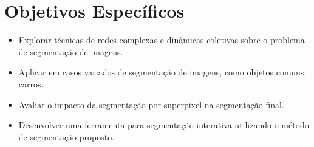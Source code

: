 \section{Objetivos Específicos}\label{sec:objetivo-geral}

\begin{itemize}
\item Explorar técnicas de redes complexas e dinâmicas coletivas sobre
  o problema de segmentação de imagens.
\item Aplicar em casos variados de segmentação de imagens, como
  objetos comuns, carros.
\item Avaliar o impacto da segmentação por superpixel na segmentação final.
\item Desenvolver uma ferramenta para segmentação interativa
  utilizando o método de segmentação proposto.
\end{itemize}



